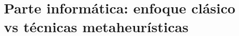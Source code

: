 ﻿\documentclass[a4paper,11pt]{article}
\begin{document}

%
\tableofcontents
\newpage
%
\setcounter{page}{1}
\setcounter{section}{0}
%


\newpage

\vspace{4cm}

\newpage 


%

%

%

%

\newpage

\part{Parte informática: enfoque clásico vs técnicas metaheurísticas}

\vspace{4cm}

\newpage











\end{document}
